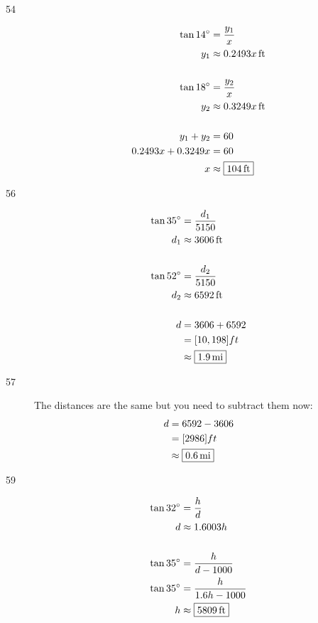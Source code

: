 \documentclass{exam}
\newcommand{\dg}{\ensuremath{^\circ}}
\begin{document}
\begin{description}
      \item[54]
        \begin{align*}
          \tan 14 \dg & = \frac{y_1}{x} \\
          y_1         & \approx \unit[0.2493 x]{ft} \\
          \\
          \tan 18 \dg & = \frac{y_2}{x} \\
          y_2         & \approx \unit[0.3249 x]{ft} \\
          \\
          y_1 + y_2           & = 60 \\
          0.2493 x + 0.3249 x & = 60 \\
          x                   & \approx \boxed{ \unit[104]{ft} } \\
        \end{align*}

      \item[56]
        \begin{align*}
            \tan 35 \dg & = \frac{d_1}{5150} \\
            d_1         & \approx \unit[3606]{ft} \\
            \\
            \tan 52 \dg & = \frac{d_2}{5150} \\
            d_2         & \approx \unit[6592]{ft} \\
            \\
            d & = 3606 + 6592 \\
              & = [ 10,198 ]{ft} \\
              & \approx \boxed{ \unit[1.9]{mi} } \\
        \end{align*}

      \item[57]
        The distances are the same but you need to subtract them now:
        \begin{align*}
          d & = 6592 - 3606  \\
            & = [ 2986 ]{ft} \\
            & \approx \boxed{ \unit[0.6]{mi} } \\
        \end{align*}

      \item[59]
        \begin{align*}
            \tan 32 \dg & = \frac{h}{d} \\
            d           & \approx 1.6003 h \\
            \\
            \tan 35 \dg & = \frac{h}{d - 1000} \\
            \tan 35 \dg & = \frac{h}{1.6h - 1000} \\
            h           & \approx \boxed{ \unit[5809]{ft} } \\
        \end{align*}


\end{description}
\end{document}
